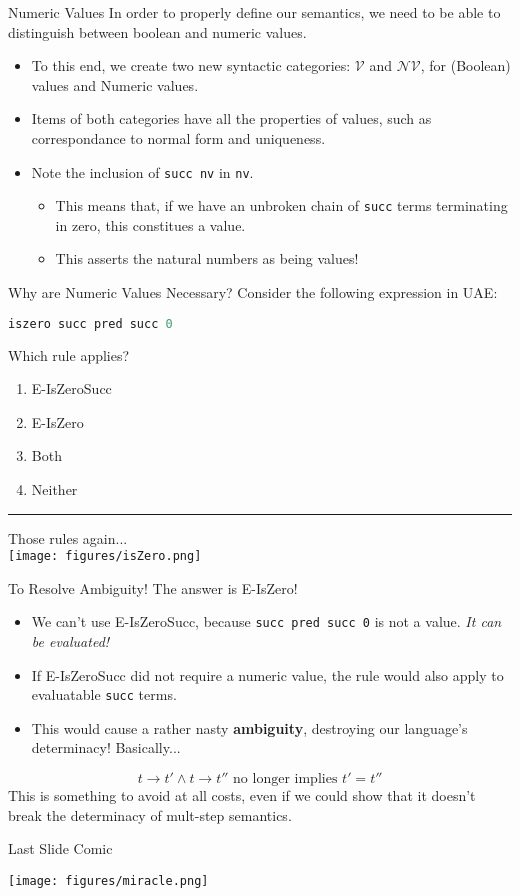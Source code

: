 \documentclass[11pt]{beamer}
\begin{document}
\begin{frame}[fragile=singleslide]{Numeric Values}
In order to properly define our semantics, we need to be able to distinguish between boolean and numeric values.  
\begin{itemize}
\item To this end, we create two new syntactic categories: $\mathcal{V}$ and $\mathcal{NV}$, for (Boolean) values and Numeric values.  
\item Items of both categories have all the properties of values, such as correspondance to normal form and uniqueness.  
\item Note the inclusion of \texttt{succ nv} in \texttt{nv}.
\begin{itemize}
\item This means that, if we have an unbroken chain of \texttt{succ} terms terminating in zero, this constitues a value.
\item This asserts the natural numbers as being values! 
\end{itemize}
\end{itemize}
\end{frame}

\begin{frame}[fragile=singleslide]{Why are Numeric Values Necessary?}
Consider the following expression in UAE: 
\begin{lstlisting}[language=C]
iszero succ pred succ 0 
\end{lstlisting}
Which rule applies?
\begin{enumerate}
\item E-IsZeroSucc
\item E-IsZero
\item Both
\item Neither
\end{enumerate}
\begin{center}
\hrule
\vspace{0.5em}
Those rules again... \\
\texttt{[image: figures/isZero.png]}
\end{center}
\end{frame}

\begin{frame}[fragile=singleslide]{To Resolve Ambiguity!}
The answer is E-IsZero!
\begin{itemize}
\item We can't use E-IsZeroSucc, because \texttt{succ pred succ 0} is not a value.  \emph{It can be evaluated!}
\item If E-IsZeroSucc did not require a numeric value, the rule would also apply to evaluatable \texttt{succ} terms.  
\item This would cause a rather nasty \textbf{ambiguity}, destroying our language's determinacy! Basically...
\end{itemize}
\begin{equation}
t \rightarrow t' \land t \rightarrow t'' \text{ no longer implies } t' = t''
\end{equation}
This is something to avoid at all costs, even if we could show that it doesn't break the determinacy of mult-step semantics.  
\end{frame}

\begin{frame}[fragile=singleslide]{Last Slide Comic}
\begin{center}
\texttt{[image: figures/miracle.png]}
\end{center}
\end{frame}
\end{document}
